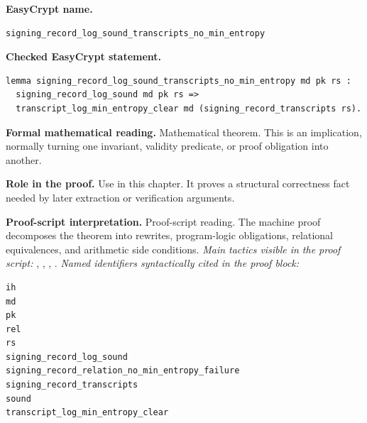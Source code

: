 \begin{formaltheorem}
\noindent\textbf{EasyCrypt name.}
\begin{lstlisting}[language=EasyCrypt,basicstyle=\ttfamily\scriptsize]
signing_record_log_sound_transcripts_no_min_entropy
\end{lstlisting}
\noindent\textbf{Checked EasyCrypt statement.}
\begin{lstlisting}[language=EasyCrypt,basicstyle=\ttfamily\scriptsize]
lemma signing_record_log_sound_transcripts_no_min_entropy md pk rs :
  signing_record_log_sound md pk rs =>
  transcript_log_min_entropy_clear md (signing_record_transcripts rs).
\end{lstlisting}
\noindent\textbf{Formal mathematical reading.}
Mathematical theorem. This is an implication, normally turning one invariant, validity predicate, or proof obligation into another.

\noindent\textbf{Role in the proof.}
Use in this chapter. It proves a structural correctness fact needed by later extraction or verification arguments.

\noindent\textbf{Proof-script interpretation.}
Proof-script reading. The machine proof decomposes the theorem into rewrites, program-logic obligations, relational equivalences, and arithmetic side conditions.
\emph{Main tactics visible in the proof script:} , , , .
\emph{Named identifiers syntactically cited in the proof block:}
\begin{lstlisting}[language=EasyCrypt,basicstyle=\ttfamily\scriptsize]
ih
md
pk
rel
rs
signing_record_log_sound
signing_record_relation_no_min_entropy_failure
signing_record_transcripts
sound
transcript_log_min_entropy_clear
\end{lstlisting}

\end{formaltheorem}

